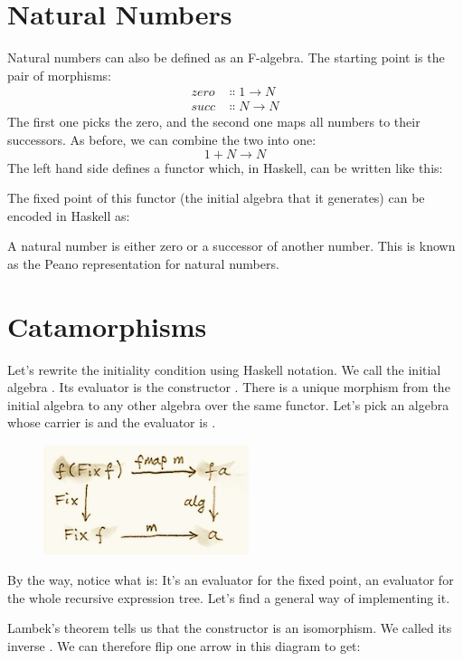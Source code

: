 \section{Natural Numbers}

Natural numbers can also be defined as an F-algebra. The starting point
is the pair of morphisms:
\begin{align*}
zero &\Colon 1 \to N \\
succ &\Colon N \to N
\end{align*}
The first one picks the zero, and the second one maps all numbers to
their successors. As before, we can combine the two into one:
\[1 + N \to N\]
The left hand side defines a functor which, in Haskell, can be written
like this:

The fixed point of this functor (the initial algebra that it generates)
can be encoded in Haskell as:

A natural number is either zero or a successor of another number. This
is known as the Peano representation for natural numbers.

\section{Catamorphisms}

Let's rewrite the initiality condition using Haskell notation. We call
the initial algebra . Its evaluator is the constructor
. There is a unique morphism  from the initial
algebra to any other algebra over the same functor. Let's pick an
algebra whose carrier is  and the evaluator is .

\begin{figure}[H]
\centering
\includegraphics[width=60mm]{images/alg5.png}
\end{figure}

\noindent
By the way, notice what  is: It's an evaluator for the fixed
point, an evaluator for the whole recursive expression tree. Let's find
a general way of implementing it.

Lambek's theorem tells us that the constructor  is an
isomorphism. We called its inverse . We can therefore flip
one arrow in this diagram to get:

